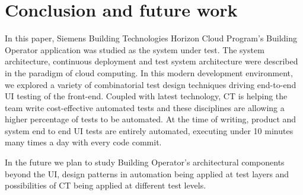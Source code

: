 \documentclass[conference]{IEEEtran}
\begin{document}
\section{Conclusion and future work}
In this paper, Siemens Building Technologies Horizon Cloud Program’s Building Operator application was studied as the system under test.
The system architecture, continuous deployment and test system architecture were described in the paradigm of cloud computing.
In this modern development environment, we explored a variety of combinatorial test design techniques driving end-to-end UI testing of the front-end.
Coupled with latest technology, CT is helping the team write cost-effective automated tests and these disciplines are allowing a higher percentage of tests to be automated.
At the time of writing, product and system end to end UI tests are entirely automated, executing under 10 minutes many times a day with every code commit.

In the future we plan to study Building Operator's architectural components beyond the UI, design patterns in automation being applied at test layers and possibilities of CT being applied at different test levels. 



\end{document}
